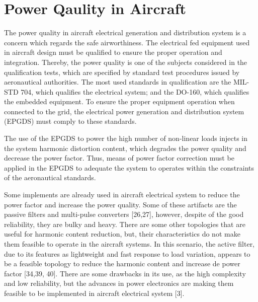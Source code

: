 \section{Power Qaulity in Aircraft}

The power quality in aircraft electrical generation and distribution system is a concern which regards the safe airworthiness. The electrical fed equipment used in aircraft design must be qualified to ensure the proper operation and integration. Thereby, the power quality is one of the subjects considered in the qualification tests, which are specified by standard test procedures issued by aeronautical authorities. The most used standards in qualification are the MIL-STD 704, which qualifies the electrical system; and the DO-160, which qualifies the embedded equipment. To ensure the proper equipment operation when connected to the grid, the electrical power generation and distribution system (EPGDS) must comply to these standards.

The use of the EPGDS to power the high number of non-linear loads injects in the system harmonic distortion content, which degrades the power quality and decrease the power factor. Thus, means of power factor correction must be applied in the EPGDS to adequate the system to operates within the constraints of the aeronautical standards.

Some implements are already used in aircraft electrical system to reduce the power factor and increase the power quality. Some of these artifacts are the passive filters and multi-pulse converters \cite{passive} \cite{Gong2003,Lobo2005} [26,27], however, despite of the good reliability, they are bulky and heavy. There are some other topologies that are useful for harmonic content reduction, but, their characteristics do not make them feasible to operate in the aircraft systems. In this scenario, the active filter, due to its features as lightweight and fast response to load variation, appears to be a feasible topology to reduce the harmonic content and increase de power factor \cite{Zhu2014,Chen2012control,Karatzaferis2013} [34,39, 40]. There are some drawbacks in its use, as the high complexity and low reliability, but the advances in power electronics are making them feasible to be implemented in aircraft electrical system \cite{Abdelhafez2009} [3].

